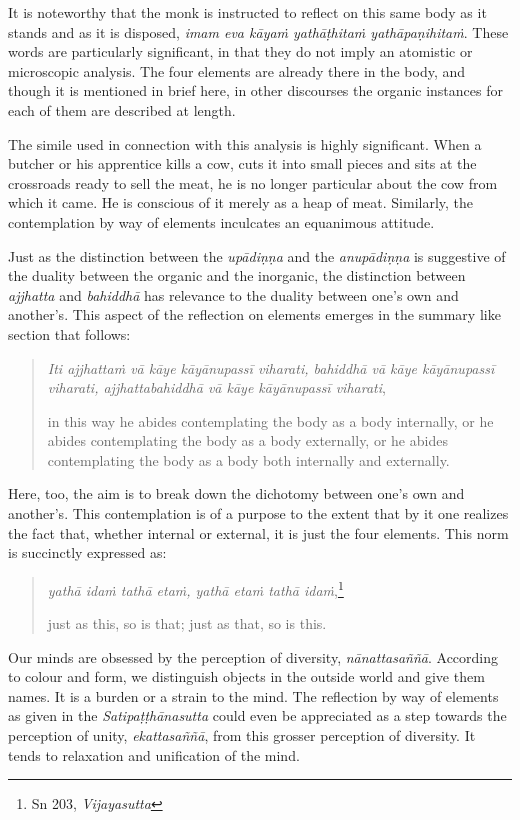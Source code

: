 It is noteworthy that the monk is instructed to reflect on this same body as it stands and as it is disposed, \emph{imam eva kāyaṁ yathāṭhitaṁ yathāpaṇihitaṁ}. These words are particularly significant, in that they do not imply an atomistic or microscopic analysis. The four elements are already there in the body, and though it is mentioned in brief here, in other discourses the organic instances for each of them are described at length.

The simile used in connection with this analysis is highly significant. When a butcher or his apprentice kills a cow, cuts it into small pieces and sits at the crossroads ready to sell the meat, he is no longer particular about the cow from which it came. He is conscious of it merely as a heap of meat. Similarly, the contemplation by way of elements inculcates an equanimous attitude.

\clearpage

Just as the distinction between the \emph{upādiṇṇa} and the \emph{anupādiṇṇa} is suggestive of the duality between the organic and the inorganic, the distinction between \emph{ajjhatta} and \emph{bahiddhā} has relevance to the duality between one's own and another's. This aspect of the reflection on elements emerges in the summary like section that follows:

\begin{quote}
\emph{Iti ajjhattaṁ vā kāye kāyānupassī viharati, bahiddhā vā kāye kāyānupassī viharati, ajjhattabahiddhā vā kāye kāyānupassī viharati},

in this way he abides contemplating the body as a body internally, or he abides contemplating the body as a body externally, or he abides contemplating the body as a body both internally and externally.
\end{quote}

Here, too, the aim is to break down the dichotomy between one's own and another's. This contemplation is of a purpose to the extent that by it one realizes the fact that, whether internal or external, it is just the four elements. This norm is succinctly expressed as:

\begin{quote}
\emph{yathā idaṁ tathā etaṁ, yathā etaṁ tathā idaṁ},\footnote{Sn 203, \emph{Vijayasutta}}

just as this, so is that; just as that, so is this.
\end{quote}

Our minds are obsessed by the perception of diversity, \emph{nānattasaññā}. According to colour and form, we distinguish objects in the outside world and give them names. It is a burden or a strain to the mind. The reflection by way of elements as given in the \emph{Satipaṭṭhānasutta} could even be appreciated as a step towards the perception of unity, \emph{ekattasaññā}, from this grosser perception of diversity. It tends to relaxation and unification of the mind.

